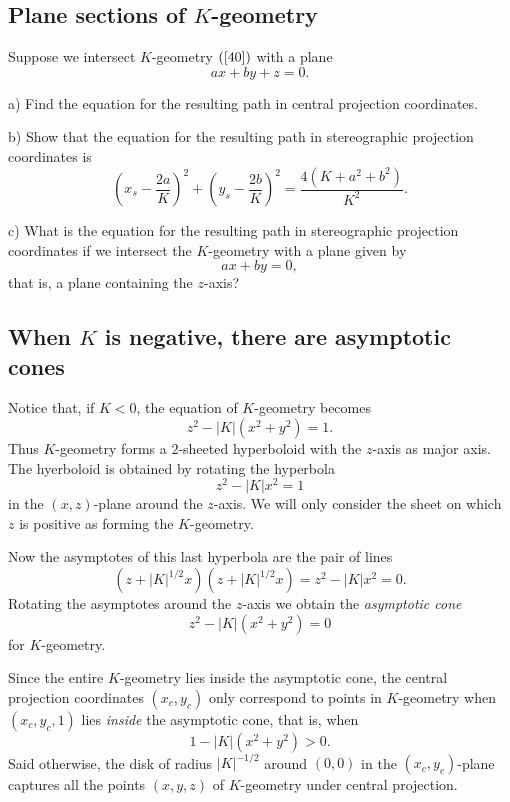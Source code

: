 \documentclass{ximera}
\begin{document}
\subsection*{Plane sections of $K$-geometry}

\begin{exercise}
\label{73}Suppose we intersect $K$-geometry $\left(  \ref{40}\right)  $ with a
plane%
\[
ax+by+z=0.
\]


a) Find the equation for the resulting path in central projection coordinates.

b) Show that the equation for the resulting path in stereographic projection
coordinates is%
\[
\left(  x_{s}-\frac{2a}{K}\right)  ^{2}+\left(  y_{s}-\frac{2b}{K}\right)
^{2}=\frac{4\left(  K+a^{2}+b^{2}\right)  }{K^{2}}.
\]


c) What is the equation for the resulting path in stereographic projection
coordinates if we intersect the $K$-geometry with a plane given by%
\[
ax+by=0,
\]
that is, a plane containing the $z$-axis?
\end{exercise}

\subsection*{When $K$ is negative, there are asymptotic cones}

Notice that, if $K<0$, the equation of $K$-geometry becomes%
\[
z^{2}-\left\vert K\right\vert \left(  x^{2}+y^{2}\right)  =1.
\]
Thus $K$-geometry forms a $2$-sheeted hyperboloid with the $z$-axis as major
axis. The hyerboloid is obtained by rotating the hyperbola%
\begin{equation}
z^{2}-\left\vert K\right\vert x^{2}=1 \label{hyp}%
\end{equation}
in the $\left(  x,z\right)  $-plane around the $z$-axis. We will only consider
the sheet on which $z$ is positive as forming the $K$-geometry.

Now the asymptotes of this last hyperbola are the pair of lines%
\[
\left(  z+\left\vert K\right\vert ^{1/2}x\right)  \left(  z+\left\vert
K\right\vert ^{1/2}x\right)  =z^{2}-\left\vert K\right\vert x^{2}=0.
\]
Rotating the asymptotes around the $z$-axis we obtain the \textit{asymptotic
cone}%
\[
z^{2}-\left\vert K\right\vert \left(  x^{2}+y^{2}\right)  =0
\]
for $K$-geometry.

Since the entire $K$-geometry lies inside the asymptotic cone, the central
projection coordinates $\left(  x_{c},y_{c}\right)  $ only correspond to
points in $K$-geometry when $\left(  x_{c},y_{c},1\right)  $ lies
\textit{inside} the asymptotic cone, that is, when%
\[
1-\left\vert K\right\vert \left(  x^{2}+y^{2}\right)  >0.
\]
Said otherwise, the disk of radius $\left\vert K\right\vert ^{-1/2}$ around
$\left(  0,0\right)  $ in the $\left(  x_{c},y_{c}\right)  $-plane captures
all the points $\left(  x,y,z\right)  $ of $K$-geometry under central projection.
\end{document}
